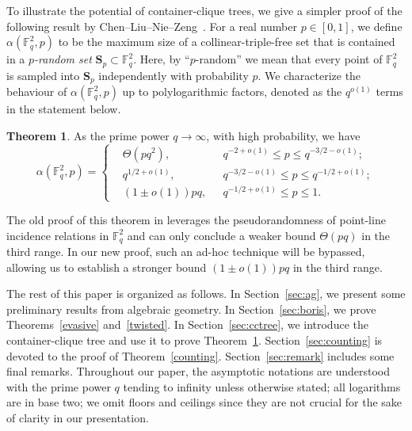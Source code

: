 \documentclass[11pt]{article}
\theoremstyle{definition}
\newtheorem{theorem}{Theorem}[section]
\begin{document}
To illustrate the potential of container-clique trees, we give a simpler proof of the following result by Chen--Liu--Nie--Zeng~\cite{chen2023random}. For a real number $p\in [0,1]$, we define $\alpha(\mathbb{F}_q^2,p)$ to be the maximum size of a collinear-triple-free set that is contained in a \textit{$p$-random set} $\mathbf{S}_p \subset \mathbb{F}_q^2$. Here, by ``$p$-random'' we mean that every point of $\mathbb{F}_q^2$ is sampled into $\mathbf{S}_p$ independently with probability $p$. We characterize the behaviour of $\alpha(\mathbb{F}_q^2,p)$ up to polylogarithmic factors, denoted as the $q^{o(1)}$ terms in the statement below.

\begin{theorem}\label{no-three-in-line}
As the prime power $q\to \infty$, with high probability, we have 
\begin{equation*}
\alpha(\mathbb{F}_q^2,p)=
\left\{
    \begin{aligned}
    &\Theta(pq^{2}),~~~&q^{-2+o(1)}\leq p\leq q^{-3/2-o(1)};\\
    &q^{1/2+o(1)},~~~&q^{-3/2-o(1)}\leq p\leq q^{-1/2+o(1)};\\
    &(1 \pm o(1))pq,~~~&q^{-1/2+o(1)}\leq p\leq 1.
\end{aligned}
\right.
\end{equation*}
\end{theorem}

The old proof of this theorem in \cite{chen2023random} leverages the pseudorandomness of point-line incidence relations in $\mathbb{F}_{q}^2$ and can only conclude a weaker bound $\Theta(pq)$ in the third range. In our new proof, such an ad-hoc technique will be bypassed, allowing us to establish a stronger bound $(1 \pm o(1))pq$ in the third range.

\bigskip

The rest of this paper is organized as follows. In Section~\ref{sec:ag}, we present some preliminary results from algebraic geometry. In Section~\ref{sec:boris}, we prove Theorems~\ref{evasive} and~\ref{twisted}. In Section~\ref{sec:cctree}, we introduce the container-clique tree and use it to prove Theorem~\ref{no-three-in-line}. Section~\ref{sec:counting} is devoted to the proof of Theorem~\ref{counting}. Section~\ref{sec:remark} includes some final remarks. Throughout our paper, the asymptotic notations are understood with the prime power $q$ tending to infinity unless otherwise stated; all logarithms are in base two; we omit floors and ceilings since they are not crucial for the sake of clarity in our presentation.
\end{document}
